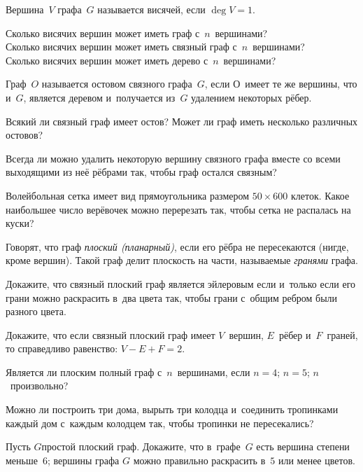 \documentclass[a4paper,12pt]{article}
\begin{document}

Вершина~$V$ графа~$G$ называется висячей, если $\deg V=1$.

Сколько висячих вершин может иметь граф с~$n$~вершинами?\\
Сколько висячих вершин может иметь связный граф с~$n$~вершинами?\\
Сколько висячих вершин может иметь дерево с~$n$~вершинами?

Граф~$O$ называется  остовом связного графа~$G$, если $О$~имеет те же вершины, что и~$G$, является деревом и~получается из~$G$ удалением некоторых рёбер.

Всякий ли связный граф имеет остов? Может ли граф иметь несколько различных остовов?

Всегда ли можно удалить некоторую вершину связного графа вместе со всеми выходящими из неё рёбрами так, чтобы граф остался связным?

Волейбольная сетка имеет вид прямоугольника размером $50\times600$ клеток. Какое наибольшее число верёвочек можно перерезать так, чтобы сетка не распалась на куски?

Говорят, что граф \emph{плоский (планарный)}, если его рёбра не пересекаются (нигде, кроме вершин). Такой граф делит плоскость на части, называемые \emph{гранями} графа.

Докажите, что связный плоский граф является эйлеровым если и~только если его грани можно раскрасить в~два цвета так, чтобы грани с~общим ребром были разного цвета.

Докажите, что если связный плоский граф имеет $V$~вершин, $E$~рёбер и~$F$~граней, то справедливо равенство: $V-E+F=2$.

Является ли плоским полный граф с~$n$~вершинами, если
$n=4$;
$n=5$;
$n$~произвольно?

Можно ли построить три дома, вырыть три колодца и~соединить тропинками каждый дом с~каждым колодцем так, чтобы тропинки не пересекались?

Пусть $G$\т простой плоский граф. Докажите, что
в~графе~$G$ есть вершина степени меньше~$6$;
вершины графа $G$ можно правильно раскрасить в~$5$ или менее цветов.


\newpage
\end{document}

